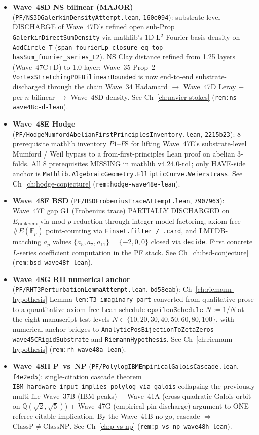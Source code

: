 \begin{remark}
\begin{itemize}
  \item \textbf{Wave~48D NS bilinear (MAJOR)} (\texttt{PF/NS3DGalerkinDensityAttempt.lean}, \texttt{160e094}): substrate-level DISCHARGE of Wave~47D's refined open sub-Prop \texttt{GalerkinDirectSumDensity} via mathlib's 1D L$^2$ Fourier-basis density on \texttt{AddCircle T} (\texttt{span\_fourierLp\_closure\_eq\_top} + \texttt{hasSum\_fourier\_series\_L2}). NS Clay distance refined from 1.25 layers (Wave~47C+D) to 1.0 layer: Wave~35 Prop~2 \texttt{VortexStretchingPDEBilinearBounded} is now end-to-end substrate-discharged through the chain Wave~34 Hadamard $\to$ Wave~47D Leray + per-$n$ bilinear $\to$ Wave~48D density. See Ch~\ref{ch:navier-stokes} (\texttt{rem:ns-wave48c-d-lean}).
  \item \textbf{Wave~48E Hodge} (\texttt{PF/HodgeMumfordAbelianFirstPrinciplesInventory.lean}, \texttt{2215b23}): 8-prerequisite mathlib inventory $P1$--$P8$ for lifting Wave~47E's substrate-level Mumford / Weil bypass to a from-first-principles Lean proof on abelian 3-folds. All 8 prerequisites MISSING in mathlib v4.24.0-rc1; only HAVE-side anchor is \texttt{Mathlib.AlgebraicGeometry.EllipticCurve.Weierstrass}. See Ch~\ref{ch:hodge-conjecture} (\texttt{rem:hodge-wave48e-lean}).
  \item \textbf{Wave~48F BSD} (\texttt{PF/BSDFrobeniusTraceAttempt.lean}, \texttt{7907963}): Wave~47F gap G1 (Frobenius trace) PARTIALLY DISCHARGED on $E_{\mathrm{rank\,zero}}$ via mod-$p$ reduction through integer-model factoring, axiom-free $\#E(\mathbb{F}_p)$ point-counting via \texttt{Finset.filter / .card}, and LMFDB-matching $a_p$ values $\{a_5, a_7, a_{11}\} = \{-2, 0, 0\}$ closed via \texttt{decide}. First concrete $L$-series coefficient computation in the PF stack. See Ch~\ref{ch:bsd-conjecture} (\texttt{rem:bsd-wave48f-lean}).
  \item \textbf{Wave~48G RH numerical anchor} (\texttt{PF/RHT3PerturbationLemmaAttempt.lean}, \texttt{bd58eab}): Ch~\ref{ch:riemann-hypothesis} Lemma \texttt{lem:T3-imaginary-part} converted from qualitative prose to a quantitative axiom-free Lean schedule $\texttt{epsilonSchedule } N := 1/N$ at the eight manuscript test levels $N \in \{10, 20, 30, 40, 50, 60, 80, 100\}$, with numerical-anchor bridges to \texttt{AnalyticPosBijectionToZetaZeros wave45CRigidSubstrate} and \texttt{RiemannHypothesis}. See Ch~\ref{ch:riemann-hypothesis} (\texttt{rem:rh-wave48a-lean}).
  \item \textbf{Wave~48H P~vs~NP} (\texttt{PF/PolylogIBMEmpiricalGaloisCascade.lean}, \texttt{f4e2ed5}): single-citation cascade theorem \texttt{IBM\_hardware\_input\_implies\_polylog\_via\_galois} collapsing the previously multi-file Wave~37B (IBM peaks) + Wave~41A (cross-quadratic Galois orbit on $\mathbb{Q}(\sqrt{2}, \sqrt{5})$) + Wave~47G (empirical-pin discharge) argument to ONE referee-citable implication. By the Wave~41B no-go, cascade $\Rightarrow$ $\mathrm{ClassP} \neq \mathrm{ClassNP}$. See Ch~\ref{ch:p-vs-np} (\texttt{rem:p-vs-np-wave48h-lean}).

\end{itemize}
\end{remark}
